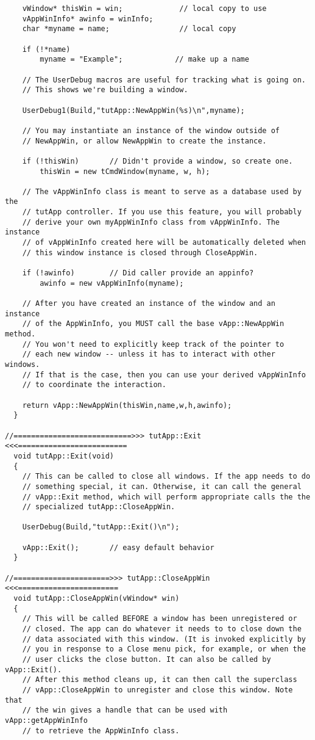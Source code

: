 \begin{verbatim}
    vWindow* thisWin = win;             // local copy to use
    vAppWinInfo* awinfo = winInfo;
    char *myname = name;                // local copy

    if (!*name)
        myname = "Example";            // make up a name
        
    // The UserDebug macros are useful for tracking what is going on.
    // This shows we're building a window.

    UserDebug1(Build,"tutApp::NewAppWin(%s)\n",myname);

    // You may instantiate an instance of the window outside of
    // NewAppWin, or allow NewAppWin to create the instance.

    if (!thisWin)       // Didn't provide a window, so create one.
        thisWin = new tCmdWindow(myname, w, h);

    // The vAppWinInfo class is meant to serve as a database used by the
    // tutApp controller. If you use this feature, you will probably
    // derive your own myAppWinInfo class from vAppWinInfo. The instance
    // of vAppWinInfo created here will be automatically deleted when
    // this window instance is closed through CloseAppWin.

    if (!awinfo)        // Did caller provide an appinfo?
        awinfo = new vAppWinInfo(myname);

    // After you have created an instance of the window and an instance
    // of the AppWinInfo, you MUST call the base vApp::NewAppWin method.
    // You won't need to explicitly keep track of the pointer to
    // each new window -- unless it has to interact with other windows.
    // If that is the case, then you can use your derived vAppWinInfo
    // to coordinate the interaction.

    return vApp::NewAppWin(thisWin,name,w,h,awinfo);
  }

//===========================>>> tutApp::Exit <<<=========================
  void tutApp::Exit(void)
  {
    // This can be called to close all windows. If the app needs to do
    // something special, it can. Otherwise, it can call the general
    // vApp::Exit method, which will perform appropriate calls the the
    // specialized tutApp::CloseAppWin.

    UserDebug(Build,"tutApp::Exit()\n");

    vApp::Exit();       // easy default behavior
  }

//======================>>> tutApp::CloseAppWin <<<=======================
  void tutApp::CloseAppWin(vWindow* win)
  {
    // This will be called BEFORE a window has been unregistered or
    // closed. The app can do whatever it needs to to close down the
    // data associated with this window. (It is invoked explicitly by
    // you in response to a Close menu pick, for example, or when the
    // user clicks the close button. It can also be called by vApp::Exit().
    // After this method cleans up, it can then call the superclass
    // vApp::CloseAppWin to unregister and close this window. Note that
    // the win gives a handle that can be used with vApp::getAppWinInfo
    // to retrieve the AppWinInfo class.


\end{verbatim}

